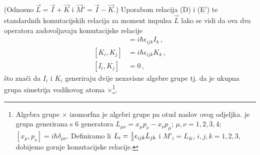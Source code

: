 (Odnosno $\vec{L} = \vec{I} + \vec{K}$ i
$\vec{M}' =  \vec{I} - \vec{K}$.)
Uporabom relacija (D) i (E') te standardnih komutacijskih
relacija za moment impulsa $\vec{L}$ lako se vidi da ova 
dva operatora zadovoljavaju komutacijske relacije
\begin{align}
[I_i, I_j] &= i \hbar \epsilon_{ijk}  I_k \,, \\
[K_i, K_j] &= i \hbar \epsilon_{ijk}  K_k \,,\\
[I_i, K_j] &= 0 \,,
\end{align}
što znači da $I_i$ i $K_i$ generiraju dvije nezavisne
algebre grupe  tj. da je ukupna grupa simetrija vodikovog
atoma $\times$\footnote{Algebra grupe
$\times$ izomorfna je algebri grupe  pa otud naslov ovog odjeljka. 
 je grupa generirana s 6
generatora $L_{\mu\nu}=x_\mu p_\nu - x_\nu p_\mu$; $\mu, \nu = 1,2,3,4$;
$[x_\mu, p_\nu] = i\hbar \delta_{\mu\nu}$. Definiramo li
$L_i = \frac{1}{2} \epsilon_{ijk} L_{jk}$ i $M'_i = L_{4i}$, $i,j,k = 1,2,3$,
dobijemo gornje komutacijske relacije.}.

